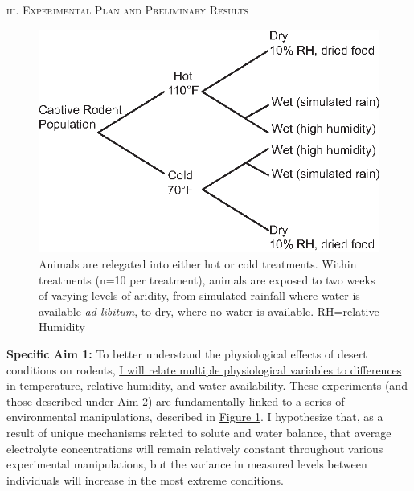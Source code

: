 \documentclass[11pt]{article}
\begin{document}
\begin{center}
\textsc{{iii. Experimental Plan and Preliminary Results}} \\
\end{center}
\begin{figure}
\hypertarget{Figure 1}{}
\vspace{-5mm}
\begin{mdframed}
  \begin{center}
    \includegraphics[width=1\textwidth]{exp_design_fig.eps}
  \end{center}
  \caption{\small{Animals are relegated into either hot or cold treatments. Within treatments (n=10 per treatment), animals are exposed to two weeks of varying levels of aridity, from simulated rainfall where water is available \textit{ad libitum}, to dry, where no water is available. RH=relative Humidity}}
\end{mdframed}
\end{figure}

\textbf{Specific Aim 1:} To better understand the physiological effects of desert conditions on rodents, \ul{I will relate multiple physiological variables to differences in temperature, relative humidity, and water availability.} These experiments (and those described under Aim 2) are fundamentally linked to a series of environmental manipulations, described in \hyperlink{Figure 1}{Figure 1}. I hypothesize that, as a result of unique mechanisms related to solute and water balance, that average electrolyte concentrations will remain relatively constant throughout various experimental manipulations, but the variance in measured levels between individuals will increase in the most extreme conditions.
\end{document}
